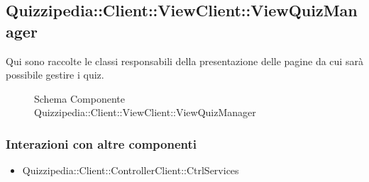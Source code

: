 \subsection{Quizzipedia::Client::ViewClient::ViewQuizManager}
Qui sono raccolte le classi responsabili della presentazione delle pagine da cui sarà possibile gestire i quiz.
\begin{figure}[H]
\centering
\noindent{}
\caption[Quizzipedia::Client::ViewClient::ViewQuizManager]{Schema Componente Quizzipedia::Client::ViewClient::ViewQuizManager}
\end{figure}
\subsubsection{Interazioni con altre componenti}
\begin{itemize}
\item Quizzipedia::Client::ControllerClient::CtrlServices
\end{itemize}
